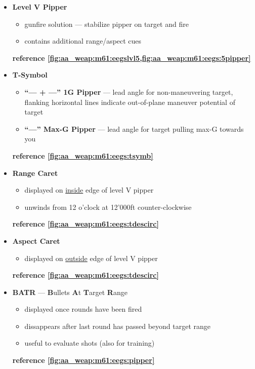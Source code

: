 \begin{itemize}
    \item \textbf{Level V Pipper}
    \begin{itemize}
        \item gunfire solution --- stabilize pipper on target and fire
        \item contains additional range/aspect cues
    \end{itemize}
    \textbf{reference \cref{fig:aa_weap:m61:eegslvl5,fig:aa_weap:m61:eegs:5pipper}}
    \item \textbf{T-Symbol}
    \begin{itemize}
        \item \textbf{``--- + ---'' 1G Pipper} --- lead angle for non-maneuvering target,
        flanking horizontal lines indicate out-of-plane maneuver potential of target
        \item \textbf{``---'' Max-G Pipper} --- lead angle for target pulling max-G towards you
    \end{itemize}
    \textbf{reference \cref{fig:aa_weap:m61:eegs:tsymb}}
    \item \textbf{Range Caret}
    \begin{itemize}
        \item displayed on \underline{inside} edge of level V pipper
        \item unwinds from 12 o'clock at 12'000ft counter-clockwise
    \end{itemize}
    \textbf{reference \cref{fig:aa_weap:m61:eegs:tdescirc}}
    \item \textbf{Aspect Caret} 
    \begin{itemize}
        \item displayed on \underline{outside} edge of level V pipper
    \end{itemize}
    \textbf{reference \cref{fig:aa_weap:m61:eegs:tdescirc}}
    \item \textbf{BATR} --- \textbf{B}ullets \textbf{A}t \textbf{T}arget \textbf{R}ange
    \begin{itemize}
        \item displayed once rounds have been fired
        \item dissappears after last round has passed beyond target range
        \item useful to evaluate shots (also for training)
    \end{itemize}
    \textbf{reference \cref{fig:aa_weap:m61:eegs:pipper}}
\end{itemize}

